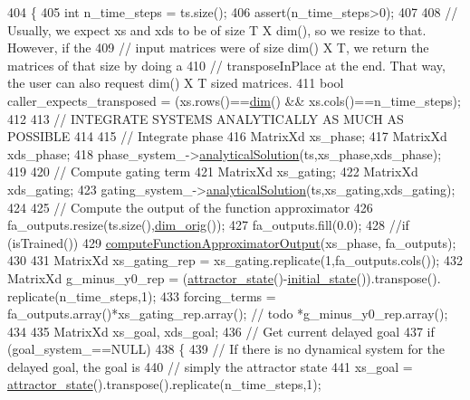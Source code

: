 \begin{DoxyCode}
404 \{
405   \textcolor{keywordtype}{int} n\_time\_steps = ts.size();
406   assert(n\_time\_steps>0);
407   
408   \textcolor{comment}{// Usually, we expect xs and xds to be of size T X dim(), so we resize to that. However, if the}
409   \textcolor{comment}{// input matrices were of size dim() X T, we return the matrices of that size by doing a }
410   \textcolor{comment}{// transposeInPlace at the end. That way, the user can also request dim() X T sized matrices.}
411   \textcolor{keywordtype}{bool} caller\_expects\_transposed = (xs.rows()==\hyperlink{group__DynamicalSystems_ga6f628f7f4ed9d77bf69f5b8560b98f18}{dim}() && xs.cols()==n\_time\_steps);
412   
413   \textcolor{comment}{// INTEGRATE SYSTEMS ANALYTICALLY AS MUCH AS POSSIBLE}
414 
415   \textcolor{comment}{// Integrate phase}
416   MatrixXd xs\_phase;
417   MatrixXd xds\_phase;
418   phase\_system\_->\hyperlink{classDmpBbo_1_1DynamicalSystem_ab6092038efc51ebd122e7c0878f6557d}{analyticalSolution}(ts,xs\_phase,xds\_phase);
419   
420   \textcolor{comment}{// Compute gating term}
421   MatrixXd xs\_gating;
422   MatrixXd xds\_gating;
423   gating\_system\_->\hyperlink{classDmpBbo_1_1DynamicalSystem_ab6092038efc51ebd122e7c0878f6557d}{analyticalSolution}(ts,xs\_gating,xds\_gating);
424 
425   \textcolor{comment}{// Compute the output of the function approximator}
426   fa\_outputs.resize(ts.size(),\hyperlink{group__DynamicalSystems_ga93d7cbbf2e471b00f124e41706405a05}{dim\_orig}());
427   fa\_outputs.fill(0.0);
428   \textcolor{comment}{//if (isTrained())}
429   \hyperlink{classDmpBbo_1_1Dmp_a89078b732a4579130e24e3bc59c1713c}{computeFunctionApproximatorOutput}(xs\_phase, fa\_outputs);
430 
431   MatrixXd xs\_gating\_rep = xs\_gating.replicate(1,fa\_outputs.cols());
432   MatrixXd g\_minus\_y0\_rep = (\hyperlink{group__DynamicalSystems_gaebe3c462bc4a725cb17bcc3d13285f13}{attractor\_state}()-\hyperlink{group__DynamicalSystems_ga4c7f24e7deec1629548a075015bdc693}{initial\_state}()).transpose().
      replicate(n\_time\_steps,1);
433   forcing\_terms = fa\_outputs.array()*xs\_gating\_rep.array(); \textcolor{comment}{// todo *g\_minus\_y0\_rep.array();}
434   
435   MatrixXd xs\_goal, xds\_goal;
436   \textcolor{comment}{// Get current delayed goal}
437   \textcolor{keywordflow}{if} (goal\_system\_==NULL)
438   \{
439     \textcolor{comment}{// If there is no dynamical system for the delayed goal, the goal is}
440     \textcolor{comment}{// simply the attractor state               }
441     xs\_goal  = \hyperlink{group__DynamicalSystems_gaebe3c462bc4a725cb17bcc3d13285f13}{attractor\_state}().transpose().replicate(n\_time\_steps,1);

\end{DoxyCode}
